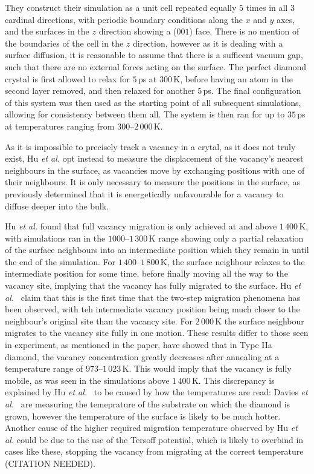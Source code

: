 \documentclass[10pt,a4paper,twocolumn,twoside]{extarticle}
\newcommand{\al}{\emph{et al. }}
\begin{document}
They construct their simulation as a unit cell repeated equally $5$ times in all $3$ cardinal directions, with periodic boundary conditions along the $x$ and $y$ axes, and the surfaces in the $z$ direction showing a ($001$) face. There is no mention of the boundaries of the cell in the $z$ direction, however as it is dealing with a surface diffusion, it is reasonable to assume that there is a sufficent vacuum gap, such that there are no external forces acting on the surface. The perfect diamond crystal is first allowed to relax for $5$\,ps at $300$\,K, before having an atom in the second layer removed, and then relaxed for another $5$\,ps. The final configuration of this system was then used as the starting point of all subsequent simulations, allowing for consistency between them all. The system is then ran for up to $35$\,ps at temperatures ranging from $300$--$2\,000$\,K. 

As it is impossible to precisely track a vacancy in a crytal, as it does not truly exist, Hu \al opt instead to measure the displacement of the vacancy's nearest neighbours in the surface, as vacancies move by exchanging positions with one of their neighbours. It is only necessary to measure the positions in the surface, as \textcite{Halicioglu} previously determined that it is energetically unfavourable for a vacancy to diffuse deeper into the bulk. 

Hu \al found that full vacancy migration is only achieved at and above $1\,400$\,K, with simulations ran in the $1000$--$1\,300$\,K range showing only a partial relaxation of the surface neighbours into an intermediate position which they remain in until the end of the simulation. For $1\,400$--$1\,800$\,K, the surface neighbour relaxes to the intermediate position for some time, before finally moving all the way to the vacancy site, implying that the vacancy has fully migrated to the surface. Hu \al~claim that this is the first time that the two-step migration phenomena has been observed, with teh intermediate vacancy position being much closer to the neighbour's original site than the vacancy site. For $2\,000$\,K the surface neighbour migrates to the vacancy site fully in one motion. These results differ to those seen in experiment, as mentioned in the paper, \textcite{Davies} have showed that in Type IIa diamond, the vacancy concentration greatly decreases after annealing at a temperature range of $973$--$1\,023$\,K. This would imply that the vacancy is fully mobile, as was seen in the simulations above $1\,400$\,K. This discrepancy is explained by Hu \al~to be caused by how the temperatures are read: Davies \al~are measuring the temeprature of the substrate on which the diamond is grown, however the temperature of the surface is likely to be much hotter. Another cause of the higher required migration temperature observed by Hu \al could be due to the use of the Tersoff potential, which is likely to overbind in cases like these, stopping the vacancy from migrating at the correct temperature (CITATION NEEDED).
\end{document}
